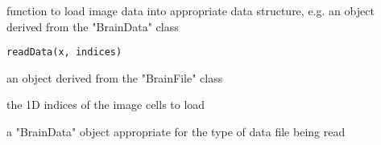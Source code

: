 \begin{Description}\relax
function to load image data into appropriate data structure, e.g. an
object derived from the "BrainData" class
\end{Description}
\begin{Usage}
\begin{verbatim}
readData(x, indices)
\end{verbatim}
\end{Usage}
\begin{Arguments}
\begin{ldescription}
\item[\code{x}] an object derived from the "BrainFile" class 
\item[\code{indices}] the 1D indices of the image cells to load 
\end{ldescription}
\end{Arguments}
\begin{Value}
a "BrainData" object appropriate for the type of data file being read
\end{Value}

